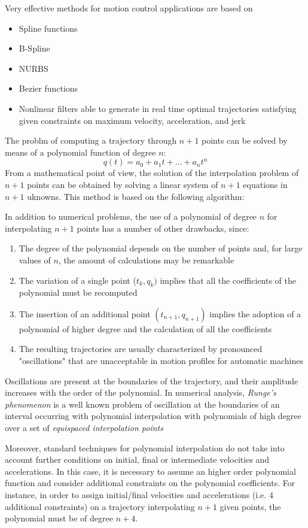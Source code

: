 \documentclass{book}
\begin{document}
Very effective methods for motion control applications are based on 
\begin{itemize}
  \item Spline functions 
  \item  B-Spline 
  \item NURBS 
  \item Bezier functions 
  \item Nonlinear filters able to generate in real time optimal trajectories satisfying given constraints on maximum velocity, acceleration, and jerk
\end{itemize}
The problm of computing a trajectory through $n+1$ points can be solved by means of a polynomial function of degree $n$: 
\[
  q(t)=a_0+a_1t+\dots+a_nt^n
\]
From a mathematical point of view, the solution of the interpolation problem of $n+1$ points can be obtained by solving a linear system of $n+1$ equations in $n+1$ uknowns. This method is based on the following algorithm: 

In addition to numerical problems, the use of a polynomial of degree $n$ for interpolating $n+1$ points has a number of other drawbacks, since: 
\begin{enumerate}
  \item The degree of the polynomial depends on the number of points and, for large values of $n$, the amount of calculations may be remarkable 
  \item The variation of a single point ($t_k,q_k)$ implies that all the coefficients of the polynomial must be recomputed 
  \item The insertion of an additional point $(t_{n+1},q_{n+1})$ implies the adoption of a polynomial of higher degree and the calculation of all the coefficients 
  \item The resulting trajectories are usually characterized by pronounced "oscillations" that are unacceptable in motion profiles for automatic machines
\end{enumerate}
Oscillations are present at the boundaries of the trajectory, and their amplitude increases with the order of the polynomial. In numerical analysis, \emph{Runge's phenomenon} is a well known problem of oscillation at the boundaries of an interval occurring with polynomial interpolation with polynomials of high degree over a set of \emph{equispaced interpolation points}

Moreover, standard techniques for polynomial interpolation do not take into account
further conditions on initial, final or intermediate velocities and accelerations. In this
case, it is necessary to assume an higher order polynomial function and consider
additional constraints on the polynomial coefficients. For instance, in order to assign
initial/final velocities and accelerations (i.e. 4 additional constraints) on a trajectory
interpolating $n + 1$ given points, the polynomial must be of degree $n + 4$. 
\end{document}
